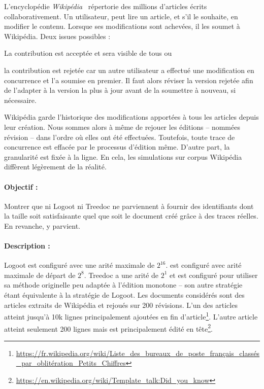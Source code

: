 L'encyclopédie \emph{Wikipédia}~\cite{wikipedia} répertorie des millions
d'articles écrits collaborativement. Un utilisateur, peut lire un article, et
s'il le souhaite, en modifier le contenu. Lorsque ses modifications sont
achevées, il les soumet à Wikipédia. Deux issues possibles :
\begin{inparaenum}[(i)]
\item La contribution est acceptée et sera visible de tous ou
\item la contribution est rejetée car un autre utilisateur a effectué une
  modification en concurrence et l'a soumise en premier. Il faut alors réviser
  la version rejetée afin de l'adapter à la version la plus à jour avant de la
  soumettre à nouveau, si nécessaire.
\end{inparaenum}
Wikipédia garde l'historique des modifications apportées à tous les articles
depuis leur création. Nous sommes alors à même de rejouer les éditions --
nommées révision -- dans l'ordre où elles ont été effectuées. Toutefois, toute
trace de concurrence est effacée par le processus d'édition même. D'autre part,
la granularité est fixée à la ligne. En cela, les simulations sur corpus
Wikipédia diffèrent légèrement de la réalité.


\paragraph{Objectif :} Montrer que ni Logoot ni Treedoc ne parviennent à fournir
des identifiants dont la taille soit satisfaisante quel que soit le document
créé grâce à des traces réelles. En revanche, \LSEQ y parvient.

\paragraph{Description :} Logoot est configuré avec une arité maximale de
$2^{16}$. \LSEQ est configuré avec arité maximale de départ de $2^{8}$. Treedoc
a une arité de $2^1$ et est configuré pour utiliser sa méthode originelle peu
adaptée à l'édition monotone -- son autre stratégie étant équivalente à la
stratégie de Logoot. Les documents considérés sont des articles extraits de
Wikipédia et rejoués sur 200 révisions. L'un des articles atteint jusqu'à 10k
lignes principalement ajoutées en fin
d'article\footnote{\scriptsize\url{https://fr.wikipedia.org/wiki/Liste_des_bureaux_de_poste_français_classés_par_oblitération_Petits_Chiffres}}. L'autre
article atteint seulement 200 lignes mais est principalement édité en
tête\footnote{\scriptsize\url{https://en.wikipedia.org/wiki/Template_talk:Did_you_know}}.


